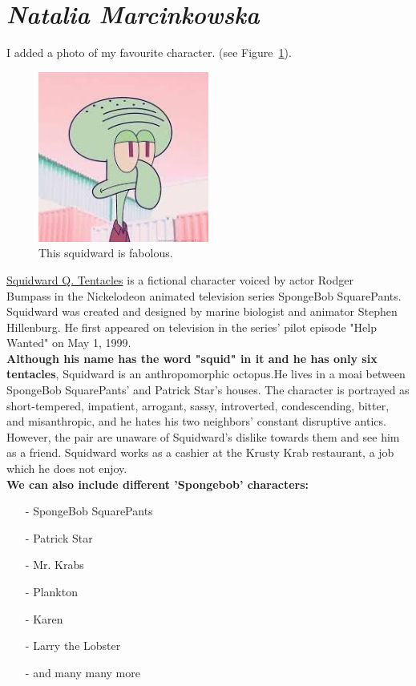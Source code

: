 \section{\textit{Natalia Marcinkowska}}
\label{sec:natmar}

I added a photo of my favourite character. (see Figure~\ref{fig:squidward}).

\begin{figure}[H]
    \centering
    \includegraphics[width=0.5\textwidth]{pictures/pic_NM.jpg} %
    \caption{This squidward is fabolous.}
    \label{fig:squidward}
\end{figure}
  \underline{Squidward Q. Tentacles} is a fictional character voiced by actor Rodger \\ 
Bumpass in the Nickelodeon animated television series SpongeBob SquarePants. 
Squidward was created and designed by marine biologist and animator Stephen Hillenburg. He first appeared on television in the series' pilot episode "Help Wanted" on May 1, 1999. \\
\textbf{Although his name has the word "squid" in it and he has only six tentacles}, Squidward is an anthropomorphic octopus.He lives in a moai between SpongeBob SquarePants' and Patrick Star's houses. The character is portrayed as short-tempered, impatient, arrogant, sassy, introverted, condescending, bitter, and misanthropic, and he hates his two neighbors' constant disruptive antics. However, the pair are unaware of Squidward's dislike towards them and see him as a friend. Squidward works as a cashier at the Krusty Krab restaurant, a job which he does not enjoy. \\


\textbf{We can also include different 'Spongebob' characters:}
\begin{itemize}
  \item [-]SpongeBob SquarePants
  \item [-]Patrick Star
  \item [-]Mr. Krabs
  \item [-]Plankton
  \item [-]Karen
  \item [-]Larry the Lobster
  \item [-]and many many more
\end{itemize} 


